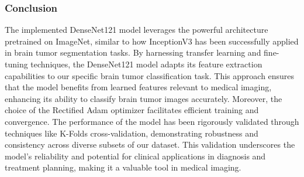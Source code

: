 

\subsubsection{Conclusion}

The implemented DenseNet121 model leverages the powerful architecture pretrained on ImageNet, similar to how InceptionV3 has been successfully applied in brain tumor segmentation tasks. By harnessing transfer learning and fine-tuning techniques, the DenseNet121 model adapts its feature extraction capabilities to our specific brain tumor classification task. This approach ensures that the model benefits from learned features relevant to medical imaging, enhancing its ability to classify brain tumor images accurately. Moreover, the choice of the Rectified Adam optimizer facilitates efficient training and convergence. The performance of the model has been rigorously validated through techniques like K-Folds cross-validation, demonstrating robustness and consistency across diverse subsets of our dataset. This validation underscores the model's reliability and potential for clinical applications in diagnosis and treatment planning, making it a valuable tool in medical imaging.
